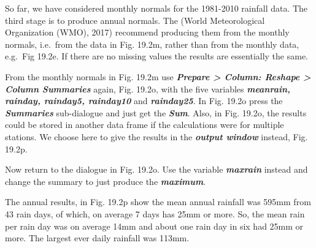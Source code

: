 \documentclass[
  letterpaper,
  DIV=11,
  numbers=noendperiod]{scrreprt}
\begin{document}
So far, we have considered monthly normals for the 1981-2010 rainfall
data. The third stage is to produce annual normals. The (World
Meteorological Organization (WMO), 2017) recommend producing them from
the monthly normals, i.e.~from the data in Fig. 19.2m, rather than from
the monthly data, e.g.~Fig 19.2e. If there are no missing values the
results are essentially the same.

From the monthly normals in Fig. 19.2m use \textbf{\emph{Prepare
\textgreater{} Column: Reshape \textgreater{} Column Summaries}} again,
Fig. 19.2o, with the five variables \textbf{\emph{meanrain, rainday,
rainday5, rainday10}} and \textbf{\emph{rainday25}}. In Fig. 19.2o press
the \textbf{\emph{Summaries}} sub-dialogue and just get the
\textbf{\emph{Sum}}. Also, in Fig. 19.2o, the results could be stored in
another data frame if the calculations were for multiple stations. We
choose here to give the results in the \textbf{\emph{output window}}
instead, Fig. 19.2p.

Now return to the dialogue in Fig. 19.2o. Use the variable
\textbf{\emph{maxrain}} instead and change the summary to just produce
the \textbf{\emph{maximum}}.

The annual results, in Fig. 19.2p show the mean annual rainfall was
595mm from 43 rain days, of which, on average 7 days has 25mm or more.
So, the mean rain per rain day was on average 14mm and about one rain
day in six had 25mm or more. The largest ever daily rainfall was 113mm.
\end{document}
